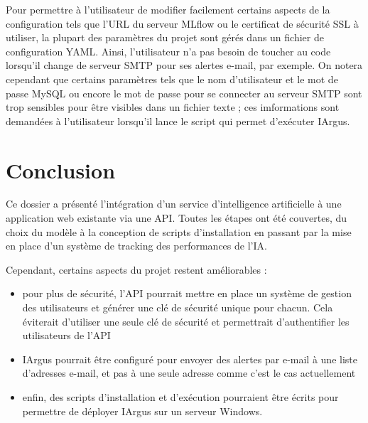 \documentclass[french]{article}
\begin{document}
    Pour permettre à l'utilisateur de modifier facilement certains aspects de la configuration tels que l'URL du serveur MLflow ou le certificat de sécurité SSL à utiliser, la plupart des paramètres du projet sont gérés dans un fichier de configuration YAML. Ainsi, l'utilisateur n'a pas besoin de toucher au code lorsqu'il change de serveur SMTP pour ses alertes e-mail, par exemple. On notera cependant que certains paramètres tels que le nom d'utilisateur et le mot de passe MySQL ou encore le mot de passe pour se connecter au serveur SMTP sont trop sensibles pour être visibles dans un fichier texte ; ces imformations sont demandées à l'utilisateur lorsqu'il lance le script qui permet d'exécuter IArgus.

    \newpage
    \section*{Conclusion}
    
    Ce dossier a présenté l'intégration d'un service d'intelligence artificielle à une application web existante via une API. Toutes les étapes ont été couvertes, du choix du modèle à la conception de scripts d'installation en passant par la mise en place d'un système de tracking des performances de l'IA.

    Cependant, certains aspects du projet restent améliorables :
    \begin{itemize}
        \item pour plus de sécurité, l'API pourrait mettre en place un système de gestion des utilisateurs et générer une clé de sécurité unique pour chacun. Cela éviterait d'utiliser une seule clé de sécurité et permettrait d'authentifier les utilisateurs de l'API
        \item IArgus pourrait être configuré pour envoyer des alertes par e-mail à une liste d'adresses e-mail, et pas à une seule adresse comme c'est le cas actuellement
        \item enfin, des scripts d'installation et d'exécution pourraient être écrits pour permettre de déployer IArgus sur un serveur Windows.
    \end{itemize}


    
\end{document}
